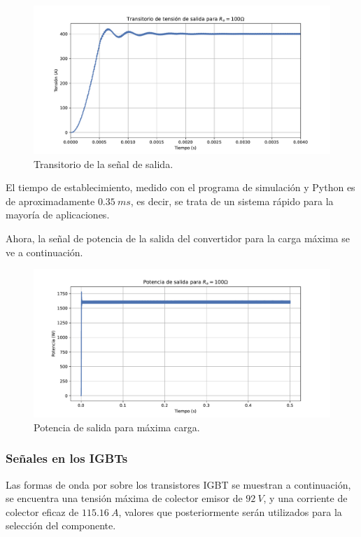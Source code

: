 \begin{figure}
	\centering
	\includegraphics[width=1\linewidth]{img/transitorio}
	\caption{Transitorio de la señal de salida.}
	\label{fig:transitorio}
\end{figure}

El tiempo de establecimiento, medido con el programa de simulación y Python es de aproximadamente $0.35 \ ms$, es decir, se trata de un sistema rápido para la mayoría de aplicaciones.


Ahora, la señal de potencia de la salida del convertidor para la carga máxima se ve a continuación.

\begin{figure}
	\centering
	\includegraphics[width=1\linewidth]{img/potencia}
	\caption{Potencia de salida para máxima carga.}
	\label{fig:potencia}
\end{figure}

\subsubsection{Señales en los IGBTs}

Las formas de onda por sobre los transistores IGBT se muestran a continuación, se encuentra una tensión máxima de colector emisor de $92 \ V$, y una corriente de colector eficaz de $115.16 \ A$, valores que posteriormente serán utilizados para la selección del componente.

